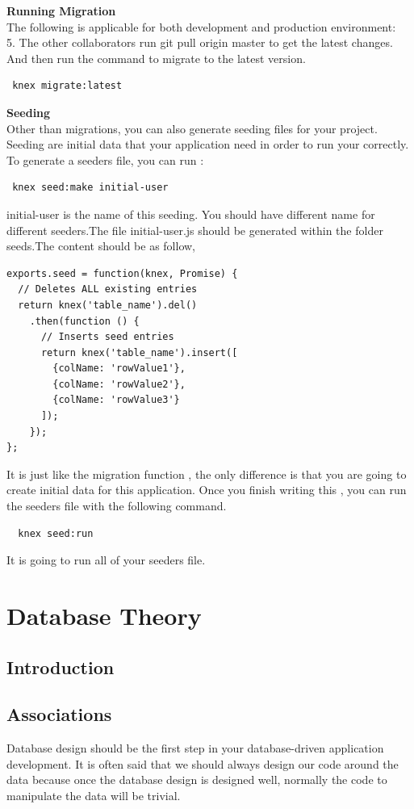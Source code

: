 \documentclass[a4paper]{article}
\begin{document}
\textbf{Running Migration}\\

The following is applicable for both development and production environment:\\

5. The other collaborators run git pull origin master to get the latest changes. And then run the command to migrate to the latest version.
\begin{lstlisting}
 knex migrate:latest
\end{lstlisting}

\textbf{Seeding}\\

Other than migrations, you can also generate seeding files for your project. Seeding are initial data that your application need in order to run your correctly. To generate a seeders file, you can run :
\begin{lstlisting}
 knex seed:make initial-user
\end{lstlisting}
initial-user is the name of this seeding. You should have different name for different seeders.The file initial-user.js should be generated within the folder seeds.The content should be as follow,
\begin{lstlisting}
exports.seed = function(knex, Promise) {
  // Deletes ALL existing entries
  return knex('table_name').del()
    .then(function () {
      // Inserts seed entries
      return knex('table_name').insert([
        {colName: 'rowValue1'},
        {colName: 'rowValue2'},
        {colName: 'rowValue3'}
      ]);
    });
};
\end{lstlisting}
It is just like the migration function , the only difference is that you are going to create initial data for this application. Once you finish writing this , you can run the seeders file with the following command.
\begin{lstlisting}
  knex seed:run
\end{lstlisting}
It is going to run all of your seeders file.



\section{Database Theory}
\subsection{Introduction}
\subsection{Associations}
Database design should be the first step in your database-driven application development. It is often said that we should always design our code around the data because once the database design is designed well, normally the code to manipulate the data will be trivial.
\end{document}
